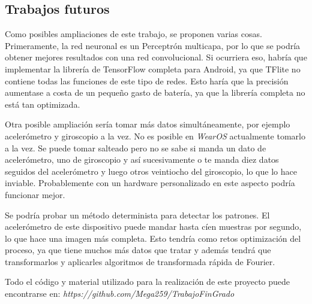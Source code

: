 \documentclass[12pt]{book}
\numberwithin{equation}{section}
\begin{document}
\subsection{Trabajos futuros}

Como posibles ampliaciones de este trabajo, se proponen varias cosas. Primeramente, la red neuronal es un Perceptrón multicapa, por lo que se podría obtener mejores resultados con una red convolucional. Si ocurriera eso, habría que implementar la librería de TensorFlow completa para Android, ya que TFlite no contiene todas las funciones de este tipo de redes. Esto haría que la precisión aumentase a costa de un pequeño gasto de batería, ya que la librería completa no está tan optimizada.

Otra posible ampliación sería tomar más datos simultáneamente, por ejemplo acelerómetro y giroscopio a la vez. No es posible en \textit{WearOS} actualmente tomarlo a la vez. Se puede tomar salteado pero no se sabe si manda un dato de acelerómetro, uno de giroscopio y así sucesivamente o te manda diez datos seguidos del acelerómetro y luego otros veintiocho del giroscopio, lo que lo hace inviable. Probablemente con un hardware personalizado en este aspecto podría funcionar mejor.

Se podría probar un método determinista para detectar los patrones. El acelerómetro de este dispositivo puede mandar hasta cíen muestras por segundo, lo que hace una imagen más completa. Esto tendría como retos optimización del proceso, ya que tiene muchos más datos que tratar y además tendrá que transformarlos y aplicarles algoritmos de transformada rápida de Fourier.



\nocite{*}



\newpage
\begin{appendices}
Todo el código y material utilizado para la realización de este proyecto puede encontrarse en: \emph{https://github.com/Mega259/TrabajoFinGrado}
\end{appendices}
\end{document}
